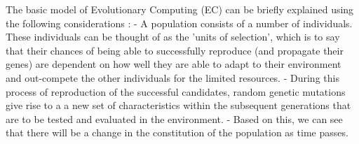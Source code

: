 


The basic model of Evolutionary Computing (EC) can be briefly explained using the following considerations \cite{EibenSmith2003}:
- A population consists of a number of individuals. These individuals can be thought of as the 'units of selection', which is to say that their chances of being able to successfully reproduce (and propagate their genes) are dependent on how well they are able to adapt to their environment and out-compete the other individuals for the limited resources.
- During this process of reproduction of the successful candidates, random genetic mutations give rise to a a new set of characteristics within the subsequent generations that are to be tested and evaluated in the environment.
- Based on this, we can see that there will be a change in the constitution of the population as time passes.



